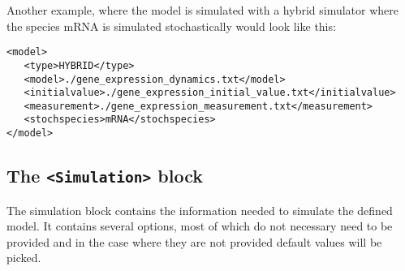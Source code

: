 \documentclass[11pt]{article} %
\begin{document}
Another example, where the model is simulated with a hybrid simulator where the species mRNA is simulated stochastically would look like this: 

\begin{tcolorbox}
\begin{verbatim}
<model>
   <type>HYBRID</type>
   <model>./gene_expression_dynamics.txt</model>
   <initialvalue>./gene_expression_initial_value.txt</initialvalue>
   <measurement>./gene_expression_measurement.txt</measurement>
   <stochspecies>mRNA</stochspecies>
</model>
\end{verbatim}
\end{tcolorbox}

\subsection{The \texttt{<Simulation>} block}
The simulation block contains the information needed to simulate the defined model. It contains several options, most of which do not necessary need to be provided and in the case where they are not provided default values will be picked.  
\end{document}
